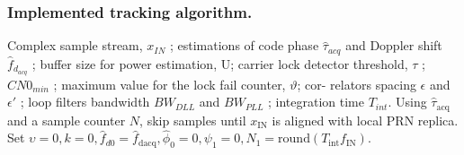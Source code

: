 \subsubsection{Implemented tracking algorithm.}
Complex sample stream, $x_{IN}$ ; estimations of code
phase $\hat{\tau}_{acq}$ and Doppler shift $\hat{f}_{d_{acq}}$ ; buffer size for
power estimation, U; carrier lock detector threshold, $\tau$ ;
$CN0_{min}$ ; maximum value for the lock fail counter, $\vartheta$; cor-
relators spacing $\epsilon$ and $\epsilon'$ ; loop filters bandwidth $BW_{DLL}$
and $BW_{PLL}$ ; integration time $T_{int}$.
Using $\hat{\tau}_{\text{acq}}$ and a sample counter $N$, skip samples until $x_{\text{IN}}$ is aligned with local PRN replica. Set $\upsilon = 0, k = 0, \hat{f}_{d0} = \hat{f}_{\text{dacq}}, \hat{\phi}_0 = 0, \psi_1 = 0, N_1 = \text{round}(T_{\text{int}}f_{\text{IN}})$.

